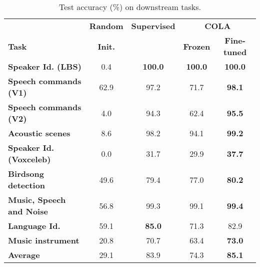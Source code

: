 \documentclass{article}
\newcommand{\ours}{COLA }
\begin{document}
\begin{table}[!t]
\centering
\caption{Test accuracy (\%) on downstream tasks.}
\vspace{0.1cm}
\footnotesize
\setlength\tabcolsep{3pt}
\label{tab:results_baseline}
\begin{tabular}{@{}lcccc@{}}
\toprule
\textbf{}                        & \textbf{Random} & \textbf{Supervised} & \multicolumn{2}{c}{\textbf{\ours}} \\
\textbf{Task}                    & \textbf{Init.}  & \textbf{}           & \textbf{Frozen}  & \textbf{Fine-tuned}  \\ \midrule
\textbf{Speaker Id. (LBS)}       & 0.4             & \textbf{100.0}      & \textbf{100.0}   & \textbf{100.0}       \\
\textbf{Speech commands (V1)}    & 62.9            & 97.2                & 71.7             & \textbf{98.1}        \\
\textbf{Speech commands (V2)}    & 4.0             & 94.3                & 62.4             & \textbf{95.5}        \\
\textbf{Acoustic scenes}         & 8.6             & 98.2                & 94.1             & \textbf{99.2}        \\
\textbf{Speaker Id. (Voxceleb)}  & 0.0             & 31.7                & 29.9             & \textbf{37.7}        \\
\textbf{Birdsong detection}      & 49.6            & 79.4                & 77.0             & \textbf{80.2}        \\
\textbf{Music, Speech and Noise} & 56.8            & 99.3                & 99.1             & \textbf{99.4}        \\
\textbf{Language Id.}            & 59.1            & \textbf{85.0}       & 71.3             & 82.9                 \\
\textbf{Music instrument}        & 20.8            & 70.7                & 63.4             & \textbf{73.0}        \\ \midrule
\textbf{Average}                 & 29.1            & 83.9                & 74.3             & \textbf{85.1}                 \\ \bottomrule
\end{tabular}
\end{table}
\end{document}
